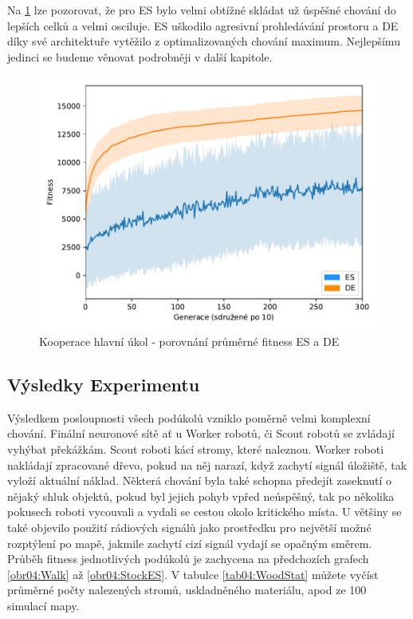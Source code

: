 	Na \ref{obr04:CoopESvsDE} lze pozorovat, že pro ES bylo velmi obtížné skládat už úspěšné chování do lepších celků a velmi osciluje. ES uškodilo agresivní prohledávání prostoru a DE díky své architektuře vytěžilo z optimalizovaných chování maximum. Nejlepšímu jedinci se budeme věnovat podrobněji v další kapitole. 
		\clearpage
		\begin{figure}[t]\centering
		\includegraphics[width=\columnwidth]{../img/WoodMap/DEvsES/WoodCoopMem}
		\caption{Kooperace  hlavní úkol  - porovnání průměrné fitness ES a DE}
		\label{obr04:CoopESvsDE}
	\end{figure}
	\clearpage
	
	\subsection*{Výsledky Experimentu}
	Výsledkem posloupnosti všech podúkolů vzniklo poměrně velmi komplexní chování. Finální neuronové sítě ať u Worker robotů, či Scout robotů se zvládají vyhýbat překážkám. Scout roboti kácí stromy, které naleznou. Worker roboti nakládají zpracované dřevo, pokud na něj narazí, když zachytí signál úložiště, tak vyloží aktuální náklad. Některá chování byla také schopna předejít zaseknutí o nějaký shluk objektů, pokud byl  jejich pohyb vpřed neúspěšný, tak po několika pokusech roboti vycouvali a vydali se cestou okolo kritického místa. U většiny se také objevilo použití rádiových signálů jako prostředku pro největší možné rozptýlení po mapě, jakmile zachytí cizí signál vydají se opačným směrem. Průběh fitness jednotlivých podúkolů je zachycena na předchozích grafech \ref{obr04:Walk} až \ref{obr04:StockES}. V tabulce \ref{tab04:WoodStat} můžete vyčíst průměrné počty nalezených stromů, uskladněného materiálu, apod ze 100 simulací mapy. 
	
